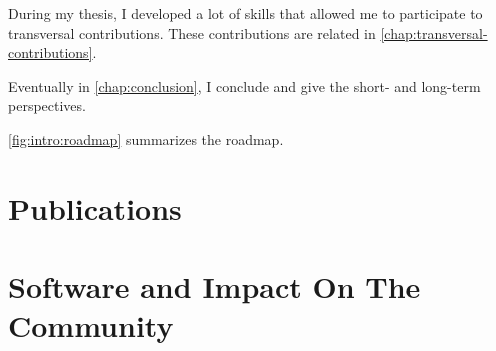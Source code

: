 During my thesis, I developed a lot of skills that allowed me to participate to transversal contributions. 
These contributions are related in \autoref{chap:transversal-contributions}.

Eventually in \autoref{chap:conclusion}, I conclude and give the short- and long-term perspectives.

\autoref{fig:intro:roadmap} summarizes the roadmap.

\section{Publications}
\label{sec:intro:publications}

\section{Software and Impact On The Community}
\label{sec:intro:software}

